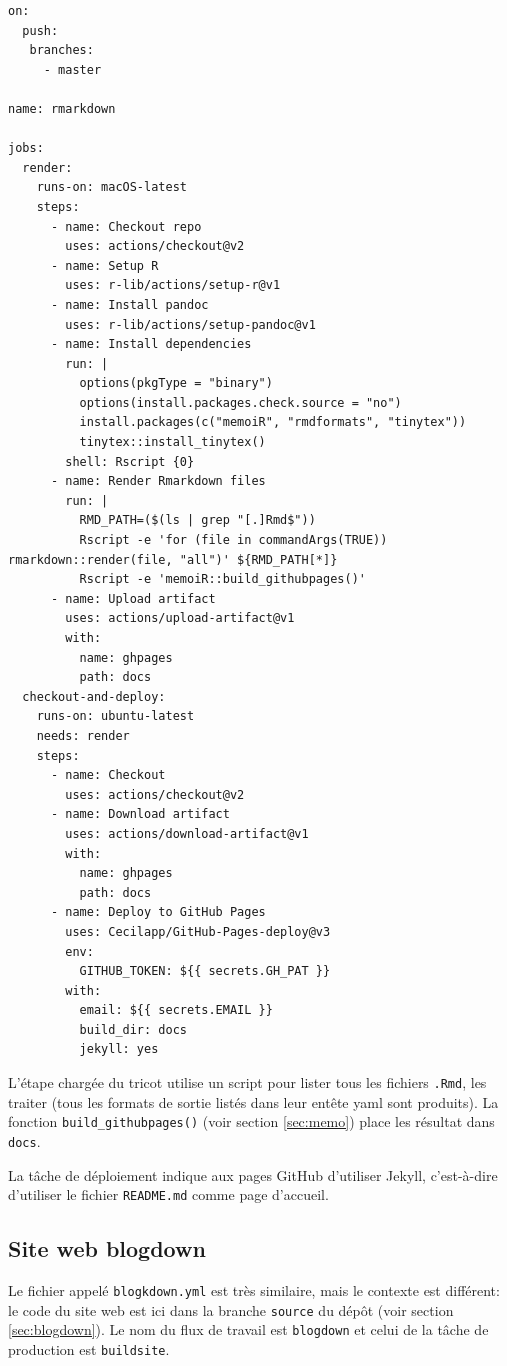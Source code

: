 \documentclass[
  12pt,
  french,
  a4paper,
  extrafontsizes,onecolumn,openright
  ]{memoir}
\begin{document}
\begin{verbatim}
on:
  push:
   branches:
     - master

name: rmarkdown

jobs:
  render:
    runs-on: macOS-latest
    steps:
      - name: Checkout repo
        uses: actions/checkout@v2
      - name: Setup R
        uses: r-lib/actions/setup-r@v1
      - name: Install pandoc
        uses: r-lib/actions/setup-pandoc@v1
      - name: Install dependencies
        run: |
          options(pkgType = "binary")
          options(install.packages.check.source = "no")
          install.packages(c("memoiR", "rmdformats", "tinytex"))
          tinytex::install_tinytex()
        shell: Rscript {0}
      - name: Render Rmarkdown files
        run: |
          RMD_PATH=($(ls | grep "[.]Rmd$"))
          Rscript -e 'for (file in commandArgs(TRUE)) rmarkdown::render(file, "all")' ${RMD_PATH[*]}
          Rscript -e 'memoiR::build_githubpages()'
      - name: Upload artifact
        uses: actions/upload-artifact@v1
        with:
          name: ghpages
          path: docs
  checkout-and-deploy:
    runs-on: ubuntu-latest
    needs: render
    steps:
      - name: Checkout
        uses: actions/checkout@v2
      - name: Download artifact
        uses: actions/download-artifact@v1
        with:
          name: ghpages
          path: docs
      - name: Deploy to GitHub Pages
        uses: Cecilapp/GitHub-Pages-deploy@v3
        env:
          GITHUB_TOKEN: ${{ secrets.GH_PAT }}
        with:
          email: ${{ secrets.EMAIL }}
          build_dir: docs
          jekyll: yes
\end{verbatim}

L'étape chargée du tricot utilise un script pour lister tous les fichiers \texttt{.Rmd}, les traiter (tous les formats de sortie listés dans leur entête yaml sont produits).
La fonction \texttt{build\_githubpages()} (voir section \ref{sec:memo}) place les résultat dans \texttt{docs}.

La tâche de déploiement indique aux pages GitHub d'utiliser Jekyll, c'est-à-dire d'utiliser le fichier \texttt{README.md} comme page d'accueil.

\hypertarget{sec:blogdown-ci}{%
\subsection{Site web blogdown}\label{sec:blogdown-ci}}

Le fichier appelé \texttt{blogkdown.yml} est très similaire, mais le contexte est différent: le code du site web est ici dans la branche \texttt{source} du dépôt (voir section \ref{sec:blogdown}).
Le nom du flux de travail est \texttt{blogdown} et celui de la tâche de production est \texttt{buildsite}.
\end{document}
